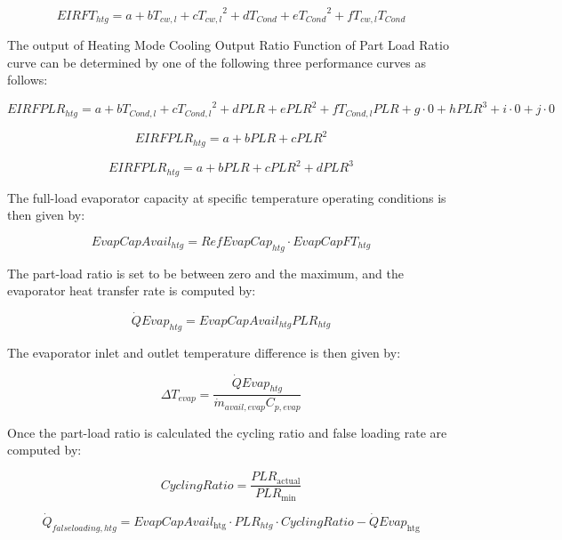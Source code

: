 \begin{equation}
EIRF{T_{htg}} = a + b{T_{cw,l}} + c{T_{cw,l}}^2 + d{T_{Cond}} + e{T_{Cond}}^2 + f{T_{cw,l}}{T_{Cond}}
\end{equation}

The output of Heating Mode Cooling Output Ratio Function of Part Load Ratio curve can be determined by one of the following three performance curves as follows:

\begin{equation}
EIRFPL{R_{htg}} = a + b{T_{Cond,l}} + c{T_{Cond,l}}^2 + dPLR + ePL{R^2} + f{T_{Cond,l}}PLR + g \cdot 0 + hPL{R^3} + i \cdot 0 + j \cdot 0
\end{equation}

\begin{equation}
EIRFPL{R_{htg}} = a + bPLR + cPL{R^2}
\end{equation}

\begin{equation}
EIRFPL{R_{htg}} = a + bPLR + cPL{R^2} + dPL{R^3}
\end{equation}

The full-load evaporator capacity at specific temperature operating conditions is then given by:

\begin{equation}
EvapCapAvai{l_{htg}} = RefEvapCa{p_{htg}} \cdot EvapCapF{T_{htg}}
\end{equation}

The part-load ratio is set to be between zero and the maximum, and the evaporator heat transfer rate is computed by:

\begin{equation}
\dot QEva{p_{htg}} = EvapCapAvai{l_{htg}}PL{R_{htg}}
\end{equation}

The evaporator inlet and outlet temperature difference is then given by:

\begin{equation}
\Delta {T_{evap}} = \frac{{\dot QEva{p_{htg}}}}{{{{\dot m}_{avail,evap}}{C_{p,evap}}}}
\end{equation}

Once the part-load ratio is calculated the cycling ratio and false loading rate are computed by:

\begin{equation}
CyclingRatio = \frac{{PL{R_{{\mathrm{actual}}}}}}{{PL{R_{{\mathrm{min}}}}}}
\end{equation}

\begin{equation}
{\dot Q_{falseloading,htg}} = EvapCapAvai{l_{{\mathrm{htg}}}} \cdot PL{R_{htg}} \cdot CyclingRatio - \dot QEva{p_{{\mathrm{htg}}}}
\end{equation}

